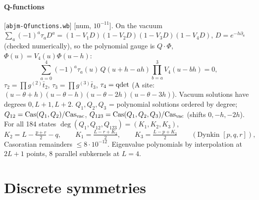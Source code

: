 \documentclass[11pt]{article}
\newcommand{\tb}{\bar t}
\newcommand{\nb}[1]{\texttt{#1}}
\newcommand{\num}[1]{\textsf{[num, $#1$]}}
\begin{document}
\paragraph{Q-functions} [\nb{abjm-Qfunctions.wb}] \num{10^{-11}}. On the vacuum
$\sum_a(-1)^a\tau_aD^a=(1-V_1D)(1-V_2D)(1-V_3D)(1-V_4D)$, $D=e^{-h\partial_u}$ (checked numerically), so the polynomial
gauge is $Q\cdot\Phi$, $\Phi(u)=V_4(u)\Phi(u-h)$:
\begin{equation}
 \sum_{a=0}^4(-1)^a\tau_a(u)\,Q(u+h-ah)\prod_{b=a}^3V_4(u-bh)=0 ,
\end{equation}
$\tau_2=\prod g^{(2)}\tb_2$, $\tau_3=\prod g^{(3)}\tb_3$, $\tau_4={\rm qdet}$ (A site: $(u-\theta+h)(u-\theta-h)(u-\theta-2h)(u-\theta-3h)$).
Vacuum solutions have degrees $0,L+1,L+2$. $Q_1,Q_2,Q_3$ = polynomial solutions ordered by degree;
$Q_{12}=\mathrm{Cas}(Q_1,Q_2)/\mathrm{Cas}_{\rm vac}$, $Q_{123}=\mathrm{Cas}(Q_1,Q_2,Q_3)/\mathrm{Cas}_{\rm vac}$ (shifts $0,-h,-2h$).
For all 184 states $\deg(Q_1,Q_{12},Q_{123})=(K_1,K_2,K_3)$,
\begin{equation}
 K_2=L-\tfrac{p+r}2-q,\qquad K_1=\tfrac{L-r+K_2}2,\qquad K_3=\tfrac{L-p+K_2}2\qquad(\text{Dynkin }[p,q,r]),
\end{equation}
Casoratian remainders $\le8\cdot10^{-12}$. Eigenvalue polynomials by interpolation at $2L+1$ points, 8 parallel subkernels
at $L=4$.

\section{Discrete symmetries}\label{sec:sym}
\end{document}
